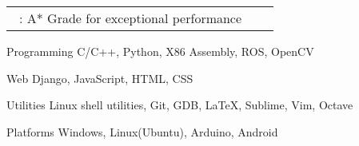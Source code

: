 \documentclass[11pt, a4paper]{awesome-cv}
\begin{document}
{{{{\begin{tabular}{l l l}
 {\footnotesize *\ : A* Grade for exceptional performance}
 \end{tabular}%
{\fontsize{12pt}{1em}\bodyfontlight\upshape\color{text}
\begin{cvskills}


  \cvskill
  {Programming}
  {C/C++, Python, X86 Assembly, ROS, OpenCV}


  \cvskill
  {Web}
  {Django, JavaScript, HTML, CSS}


  \cvskill
  {Utilities}
  {Linux shell utilities, Git, GDB, \LaTeX, Sublime, Vim, Octave}
  
  \cvskill
  {Platforms}
  {Windows, Linux(Ubuntu), Arduino, Android}
\end{cvskills}



}}}}}
\end{document}
